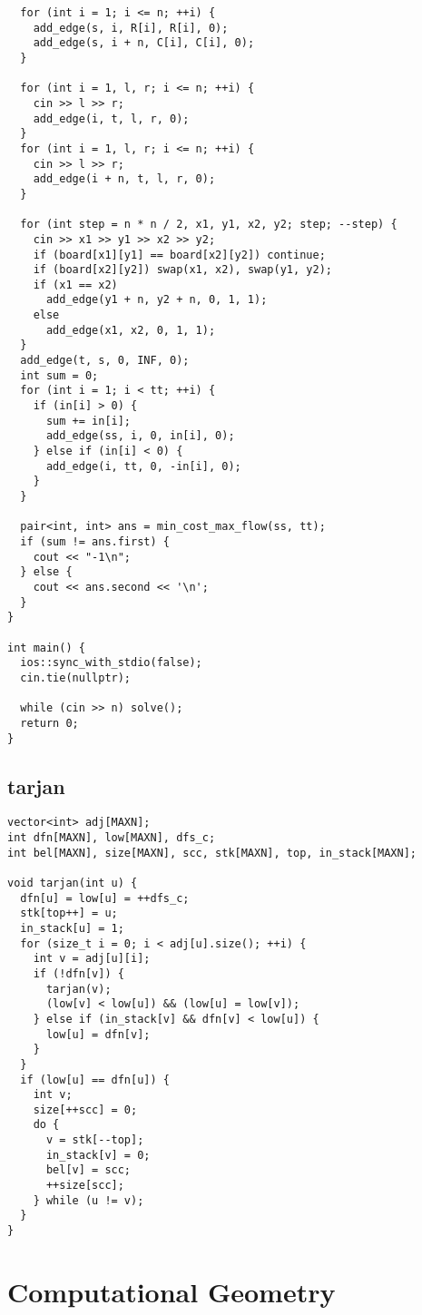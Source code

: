 \documentclass[twoside]{article}
\begin{document}
\begin{lstlisting}
  for (int i = 1; i <= n; ++i) {
    add_edge(s, i, R[i], R[i], 0);
    add_edge(s, i + n, C[i], C[i], 0);
  }

  for (int i = 1, l, r; i <= n; ++i) {
    cin >> l >> r;
    add_edge(i, t, l, r, 0);
  }
  for (int i = 1, l, r; i <= n; ++i) {
    cin >> l >> r;
    add_edge(i + n, t, l, r, 0);
  }

  for (int step = n * n / 2, x1, y1, x2, y2; step; --step) {
    cin >> x1 >> y1 >> x2 >> y2;
    if (board[x1][y1] == board[x2][y2]) continue;
    if (board[x2][y2]) swap(x1, x2), swap(y1, y2);
    if (x1 == x2)
      add_edge(y1 + n, y2 + n, 0, 1, 1);
    else
      add_edge(x1, x2, 0, 1, 1);
  }
  add_edge(t, s, 0, INF, 0);
  int sum = 0;
  for (int i = 1; i < tt; ++i) {
    if (in[i] > 0) {
      sum += in[i];
      add_edge(ss, i, 0, in[i], 0);
    } else if (in[i] < 0) {
      add_edge(i, tt, 0, -in[i], 0);
    }
  }

  pair<int, int> ans = min_cost_max_flow(ss, tt);
  if (sum != ans.first) {
    cout << "-1\n";
  } else {
    cout << ans.second << '\n';
  }
}

int main() {
  ios::sync_with_stdio(false);
  cin.tie(nullptr);

  while (cin >> n) solve();
  return 0;
}

\end{lstlisting}
\subsection{tarjan}
\begin{lstlisting}
vector<int> adj[MAXN];
int dfn[MAXN], low[MAXN], dfs_c;
int bel[MAXN], size[MAXN], scc, stk[MAXN], top, in_stack[MAXN];

void tarjan(int u) {
  dfn[u] = low[u] = ++dfs_c;
  stk[top++] = u;
  in_stack[u] = 1;
  for (size_t i = 0; i < adj[u].size(); ++i) {
    int v = adj[u][i];
    if (!dfn[v]) {
      tarjan(v);
      (low[v] < low[u]) && (low[u] = low[v]);
    } else if (in_stack[v] && dfn[v] < low[u]) {
      low[u] = dfn[v];
    }
  }
  if (low[u] == dfn[u]) {
    int v;
    size[++scc] = 0;
    do {
      v = stk[--top];
      in_stack[v] = 0;
      bel[v] = scc;
      ++size[scc];
    } while (u != v);
  }
}

\end{lstlisting}

\section{Computational Geometry}
\end{document}
